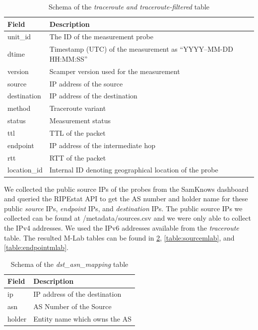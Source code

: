 \begin{table}[!h]
	\centering
	\caption{Schema of the \textit{traceroute and traceroute-filtered} table}
	\label{table:traceroutemlab}
	\begin{tabular}{lp{10cm}}
  		\toprule
  		\textbf{Field} & \textbf{Description} \\ 
  		\midrule
  		unit\_id & The ID of the measurement probe \\ 
  		dtime & Timestamp (UTC) of the measurement as “YYYY–MM-DD HH:MM:SS” \\ 
		version & Scamper version used for the measurement \\ 
		source &  IP address of the source \\ 
		destination & IP address of the destination \\ 
		method & Traceroute variant \\ 
		status & Measurement status \\  
		ttl & TTL of the packet \\ 
		endpoint & IP address of the intermediate hop \\
		rtt & RTT of the packet \\
		location\_id & Internal ID denoting geographical location of the probe \\
  		\bottomrule
\end{tabular}
\end{table}

\FloatBarrier

We collected the public source IPs of the probes from the SamKnows \cite{samknows} dashboard and queried the RIPEstat \cite{ripestat} API to get the AS number and holder name for these public \textit{source} IPs, \textit{endpoint} IPs, and \textit{destination} IPs. The public source IPs we collected can be found at /metadata/sources.csv and we were only able to collect the IPv4 addresses. We used the IPv6 addresses available from the \textit{traceroute} table. The resulted M-Lab tables can be found in \cref{table:destinationmlab}, \cref{table:sourcemlab}, and \cref{table:endpointmlab}.

\begin{table}[!h]
	\centering
	\caption{Schema of the \textit{dst\_asn\_mapping} table}
	\label{table:destinationmlab}
	\begin{tabular}{lp{7cm}}
  		\toprule
  		\textbf{Field} & \textbf{Description} \\ 
  		\midrule
  		ip & IP address of the destination \\
  		asn & AS Number of the Source \\
  		holder & Entity name which owns the AS \\
  		\bottomrule
\end{tabular}
\end{table}

